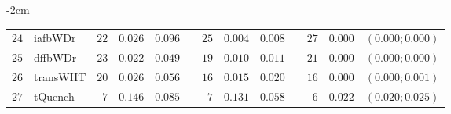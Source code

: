 \begin{table*}[!htbp]
\begin{adjustwidth*}{}{-2cm}
\begin{tabular}{@{}rlrrrrrrrrrcc@{}}
\footnotesize{$24$} & \footnotesize{iafbWDr  } & \footnotesize{$22$} & \footnotesize{$0.026$} & \footnotesize{$0.096$} && \footnotesize{$25$} & \footnotesize{$0.004$} & \footnotesize{$0.008$} && \footnotesize{$27$} & \footnotesize{$0.000$} & \footnotesize{$(0.000;0.000)$} \\
\footnotesize{$25$} & \footnotesize{dffbWDr  } & \footnotesize{$23$} & \footnotesize{$0.022$} & \footnotesize{$0.049$} && \footnotesize{$19$} & \footnotesize{$0.010$} & \footnotesize{$0.011$} && \footnotesize{$21$} & \footnotesize{$0.000$} & \footnotesize{$(0.000;0.000)$} \\
\footnotesize{$26$} & \footnotesize{transWHT } & \footnotesize{$20$} & \footnotesize{$0.026$} & \footnotesize{$0.056$} && \footnotesize{$16$} & \footnotesize{$0.015$} & \footnotesize{$0.020$} && \footnotesize{$16$} & \footnotesize{$0.000$} & \footnotesize{$(0.000;0.001)$} \\
\footnotesize{$27$} & \footnotesize{tQuench  } & \footnotesize{$7 $} & \footnotesize{$0.146$} & \footnotesize{$0.085$} && \footnotesize{$7 $} & \footnotesize{$0.131$} & \footnotesize{$0.058$} && \footnotesize{$6 $} & \footnotesize{$0.022$} & \footnotesize{$(0.020;0.025)$} \\
\bottomrule
\end{tabular}
\end{adjustwidth*}
\end{table*}

